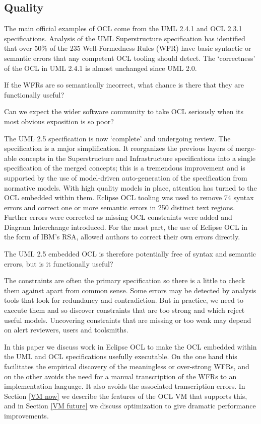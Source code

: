 \documentclass{sig-alternate}
\begin{document}
\subsection{Quality}

The main official examples of OCL come from the UML 2.4.1\cite{UML-2.4.1-Super} and OCL 2.3.1\cite{OCL-2.3.1} specifications. Analysis\cite{UML-inconsistent} of the UML Superstructure specification has identified that over 50\% of the 235 Well-Formedness Rules (WFR) have basic syntactic or semantic errors
that any competent OCL tooling should detect. The `correctness' of the OCL in UML 2.4.1 is almost unchanged
since UML 2.0.

If the WFRs are so semantically incorrect, what chance is there that they are functionally useful?

Can we expect the wider software community to take OCL seriously when its most obvious exposition is so poor?

The UML 2.5 specification is now `complete' and undergoing review. The specification is a major simplification. It
reorganizes the previous layers of merge-able concepts in the Superstructure and Infrastructure specifications into
a single specification of the merged concepts; this is a tremendous improvement and is supported by the use of
model-driven auto-generation of the specification from normative models. With high quality models in place, attention has
turned to the OCL embedded within them. Eclipse OCL\cite{MDT/OCL} tooling was used to remove 74 syntax errors and correct one or more semantic errors in 250 distinct text regions. Further errors were corrected as missing OCL constraints were added and Diagram Interchange introduced.
For the most part, the use of Eclipse OCL in the form of IBM's RSA, allowed authors to correct their own errors directly.

The UML 2.5 embedded OCL is therefore potentially free of syntax and semantic errors, but is it functionally useful?

The constraints are often the primary specification so there is a little to check them against apart from common sense.
Some errors may be detected by analysis tools that look for redundancy and contradiction. But in practice, we need to
execute them and so discover constraints that are too strong and which reject useful models. Uncovering constraints
that are missing or too weak may depend on alert reviewers, users and toolsmiths.

In this paper we discuss work in Eclipse OCL to make the OCL embedded within the UML and OCL specifications usefully
executable. On the one hand this facilitates the empirical discovery of the meaningless or over-strong WFRs, and on the other avoids the need for a manual transcription of the WFRs to an implementation language. It also avoids the associated transcription errors. In Section \ref{VM now} we describe the features of the OCL VM that supports this, and in Section \ref{VM future} we discuss optimization to give dramatic performance improvements. 
\end{document}
